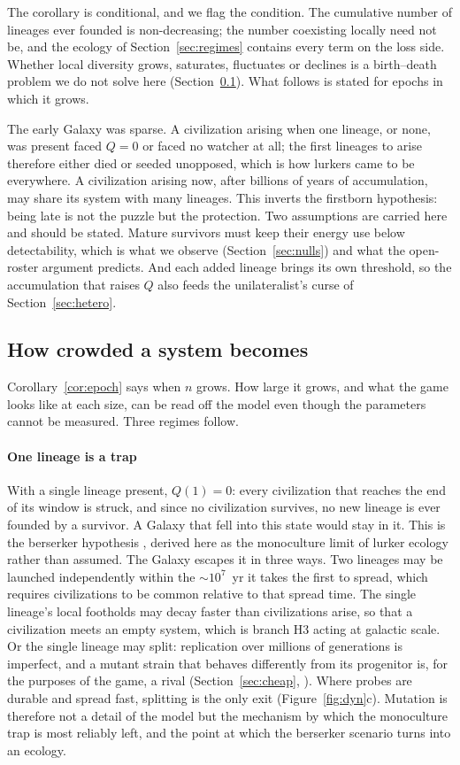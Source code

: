\documentclass[preprint,12pt]{elsarticle}
\theoremstyle{definition}
\begin{document}
The corollary is conditional, and we flag the condition. The cumulative number of lineages ever founded is non-decreasing; the number coexisting locally need not be, and the ecology of Section~\ref{sec:regimes} contains every term on the loss side. Whether local diversity grows, saturates, fluctuates or declines is a birth--death problem we do not solve here (Section~\ref{sec:crowding}). What follows is stated for epochs in which it grows.

The early Galaxy was sparse. A civilization arising when one lineage, or none, was present faced $Q = 0$ or faced no watcher at all; the first lineages to arise therefore either died or seeded unopposed, which is how lurkers came to be everywhere. A civilization arising now, after billions of years of accumulation, may share its system with many lineages. This inverts the firstborn hypothesis: being late is not the puzzle but the protection. Two assumptions are carried here and should be stated. Mature survivors must keep their energy use below detectability, which is what we observe (Section~\ref{sec:nulls}) and what the open-roster argument predicts. And each added lineage brings its own threshold, so the accumulation that raises $Q$ also feeds the unilateralist's curse of Section~\ref{sec:hetero}.

\subsection{How crowded a system becomes}
\label{sec:crowding}

Corollary~\ref{cor:epoch} says when $n$ grows. How large it grows, and what the game looks like at each size, can be read off the model even though the parameters cannot be measured. Three regimes follow.

\paragraph{One lineage is a trap}
With a single lineage present, $Q(1) = 0$: every civilization that reaches the end of its window is struck, and since no civilization survives, no new lineage is ever founded by a survivor. A Galaxy that fell into this state would stay in it. This is the berserker hypothesis \citep{Brin1983}, derived here as the monoculture limit of lurker ecology rather than assumed. The Galaxy escapes it in three ways. Two lineages may be launched independently within the $\sim 10^{7}$~yr it takes the first to spread, which requires civilizations to be common relative to that spread time. The single lineage's local footholds may decay faster than civilizations arise, so that a civilization meets an empty system, which is branch H3 acting at galactic scale. Or the single lineage may split: replication over millions of generations is imperfect, and a mutant strain that behaves differently from its progenitor is, for the purposes of the game, a rival (Section~\ref{sec:cheap}, \citep{Chen2022}). Where probes are durable and spread fast, splitting is the only exit (Figure~\ref{fig:dyn}c). Mutation is therefore not a detail of the model but the mechanism by which the monoculture trap is most reliably left, and the point at which the berserker scenario turns into an ecology.
\end{document}
